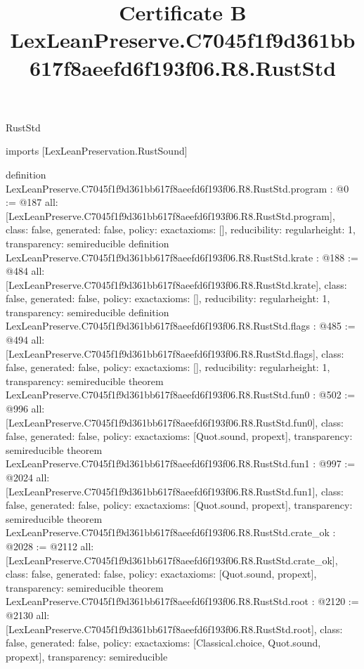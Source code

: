 \begin{lexlean}{RustStd}
\title{Certificate B LexLeanPreserve.C7045f1f9d361bb617f8aeefd6f193f06.R8.RustStd}
\begin{coremodule}
imports [LexLeanPreservation.RustSound]

definition LexLeanPreserve.C7045f1f9d361bb617f8aeefd6f193f06.R8.RustStd.program : @0 := @187 {
  all: [LexLeanPreserve.C7045f1f9d361bb617f8aeefd6f193f06.R8.RustStd.program],
  class: false,
  generated: false,
  policy: exact{axioms: []},
  reducibility: regular{height: 1},
  transparency: semireducible
}
definition LexLeanPreserve.C7045f1f9d361bb617f8aeefd6f193f06.R8.RustStd.krate : @188 := @484 {
  all: [LexLeanPreserve.C7045f1f9d361bb617f8aeefd6f193f06.R8.RustStd.krate],
  class: false,
  generated: false,
  policy: exact{axioms: []},
  reducibility: regular{height: 1},
  transparency: semireducible
}
definition LexLeanPreserve.C7045f1f9d361bb617f8aeefd6f193f06.R8.RustStd.flags : @485 := @494 {
  all: [LexLeanPreserve.C7045f1f9d361bb617f8aeefd6f193f06.R8.RustStd.flags],
  class: false,
  generated: false,
  policy: exact{axioms: []},
  reducibility: regular{height: 1},
  transparency: semireducible
}
theorem LexLeanPreserve.C7045f1f9d361bb617f8aeefd6f193f06.R8.RustStd.fun0 : @502 := @996 {
  all: [LexLeanPreserve.C7045f1f9d361bb617f8aeefd6f193f06.R8.RustStd.fun0],
  class: false,
  generated: false,
  policy: exact{axioms: [Quot.sound, propext]},
  transparency: semireducible
}
theorem LexLeanPreserve.C7045f1f9d361bb617f8aeefd6f193f06.R8.RustStd.fun1 : @997 := @2024 {
  all: [LexLeanPreserve.C7045f1f9d361bb617f8aeefd6f193f06.R8.RustStd.fun1],
  class: false,
  generated: false,
  policy: exact{axioms: [Quot.sound, propext]},
  transparency: semireducible
}
theorem LexLeanPreserve.C7045f1f9d361bb617f8aeefd6f193f06.R8.RustStd.crate_ok : @2028 := @2112 {
  all: [LexLeanPreserve.C7045f1f9d361bb617f8aeefd6f193f06.R8.RustStd.crate_ok],
  class: false,
  generated: false,
  policy: exact{axioms: [Quot.sound, propext]},
  transparency: semireducible
}
theorem LexLeanPreserve.C7045f1f9d361bb617f8aeefd6f193f06.R8.RustStd.root : @2120 := @2130 {
  all: [LexLeanPreserve.C7045f1f9d361bb617f8aeefd6f193f06.R8.RustStd.root],
  class: false,
  generated: false,
  policy: exact{axioms: [Classical.choice, Quot.sound, propext]},
  transparency: semireducible
}


\end{coremodule}
\end{lexlean}
